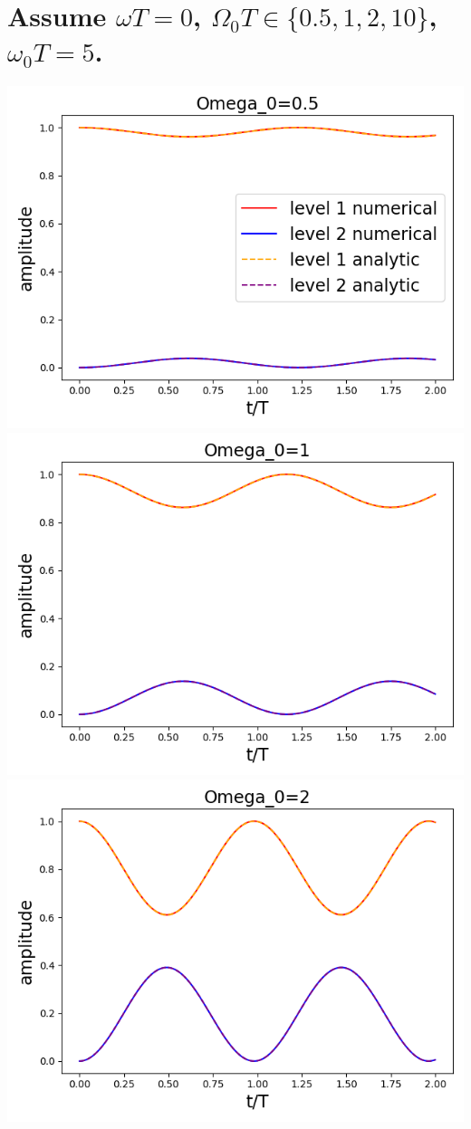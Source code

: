 \documentclass[11pt, oneside]{book}
\theoremstyle{break}
\theoremstyle{break}
\begin{document}
\section{Assume $\omega T = 0$, $\Omega_0 T\in\{0.5, 1,2,10\}$, $\omega_0 T = 5$.}
\begin{center}
\includegraphics[scale=0.39]{542HW1/a0.5}
\includegraphics[scale=0.39]{542HW1/a1}\\
\includegraphics[scale=0.39]{542HW1/a2}

\end{center}
\end{document}
